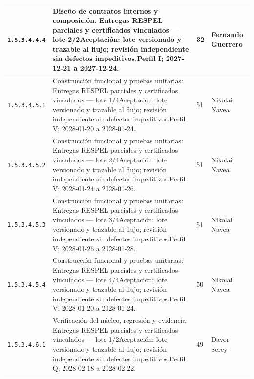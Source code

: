 \begin{longtable}{L{29mm}L{80mm}R{12mm}L{28mm}}
\texttt{1.\allowbreak{}5.\allowbreak{}3.\allowbreak{}4.\allowbreak{}4.\allowbreak{}4} & Diseño de contratos internos y composición: Entregas RESPEL parciales y certificados vinculados — lote 2/2\newline Aceptación: lote versionado y trazable al flujo; revisión independiente sin defectos impeditivos.\newline Perfil I; 2027-12-21 a 2027-12-24. & 32 & Fernando Guerrero\\\hline
\texttt{1.\allowbreak{}5.\allowbreak{}3.\allowbreak{}4.\allowbreak{}5.\allowbreak{}1} & Construcción funcional y pruebas unitarias: Entregas RESPEL parciales y certificados vinculados — lote 1/4\newline Aceptación: lote versionado y trazable al flujo; revisión independiente sin defectos impeditivos.\newline Perfil V; 2028-01-20 a 2028-01-24. & 51 & Nikolai Navea\\\hline
\texttt{1.\allowbreak{}5.\allowbreak{}3.\allowbreak{}4.\allowbreak{}5.\allowbreak{}2} & Construcción funcional y pruebas unitarias: Entregas RESPEL parciales y certificados vinculados — lote 2/4\newline Aceptación: lote versionado y trazable al flujo; revisión independiente sin defectos impeditivos.\newline Perfil V; 2028-01-24 a 2028-01-26. & 51 & Nikolai Navea\\\hline
\texttt{1.\allowbreak{}5.\allowbreak{}3.\allowbreak{}4.\allowbreak{}5.\allowbreak{}3} & Construcción funcional y pruebas unitarias: Entregas RESPEL parciales y certificados vinculados — lote 3/4\newline Aceptación: lote versionado y trazable al flujo; revisión independiente sin defectos impeditivos.\newline Perfil V; 2028-01-26 a 2028-01-28. & 51 & Nikolai Navea\\\hline
\texttt{1.\allowbreak{}5.\allowbreak{}3.\allowbreak{}4.\allowbreak{}5.\allowbreak{}4} & Construcción funcional y pruebas unitarias: Entregas RESPEL parciales y certificados vinculados — lote 4/4\newline Aceptación: lote versionado y trazable al flujo; revisión independiente sin defectos impeditivos.\newline Perfil V; 2028-01-20 a 2028-01-24. & 50 & Nikolai Navea\\\hline
\texttt{1.\allowbreak{}5.\allowbreak{}3.\allowbreak{}4.\allowbreak{}6.\allowbreak{}1} & Verificación del núcleo, regresión y evidencia: Entregas RESPEL parciales y certificados vinculados — lote 1/2\newline Aceptación: lote versionado y trazable al flujo; revisión independiente sin defectos impeditivos.\newline Perfil Q; 2028-02-18 a 2028-02-22. & 49 & Davor Serey\\\hline

\end{longtable}
